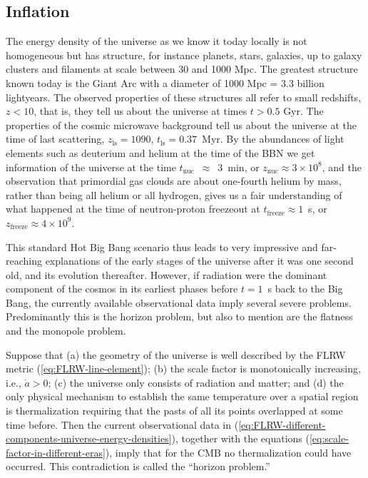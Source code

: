 \subsection{Inflation}
The energy density of the universe as we know it today locally is not homogeneous but has structure, for instance planets, stars, galaxies, up to galaxy clusters and filaments at scale between 30 and 1000 Mpc. The greatest structure known today is the Giant Arc with a diameter of 1000 Mpc = 3.3 billion lightyears. \cite{Lopez-et-al-2022}
The observed properties of these structures all refer to small redshifts, $z < 10$, that is, they tell us about the universe at times $t > 0.5$ Gyr. The properties of the cosmic microwave background tell us about the universe at the time of last scattering, $z_{\mathrm{ls}} = 1090$, $t_{\mathrm{ls}} = 0.37$~Myr. By the abundances of light elements such as deuterium and helium at the time of the BBN we get information of the universe at the time $t_{\mathrm{nuc}}$~$\approx$~3~min, or $z_{\mathrm{nuc}} \approx 3 \times 10^{8}$, and the observation that primordial gas clouds are about one-fourth helium by mass, rather than being all helium or all hydrogen, gives us a fair understanding of what happened at the time of neutron-proton freezeout at $t_{\mathrm{freeze}} \approx 1$~s, or $z_{\mathrm{freeze}} \approx 4 \times 10^{9}$.
\cite[185]{Ryden-2017}

This standard Hot Big Bang scenario thus leads to very impressive and far-reaching explanations of the early stages of the universe after it was one second old, and its evolution thereafter. However, if radiation were the dominant component of the cosmos in its earliest phases before $t = 1$~s back to the Big Bang, the currently available observational data imply several severe problems. Predominantly this is the horizon problem, but also to mention are the flatness and the monopole problem. \cite[186-192]{Ryden-2017}

\begin{satz}
	\label{theo:horizon-problem}
	Suppose that 
	(a) the geometry of the universe is well described by the FLRW metric (\ref{eq:FLRW-line-element});
	(b) the scale factor is monotonically increasing, i.e., $\dot{a} > 0$;
	(c) the universe only consists of radiation and matter;
	and (d) the only physical mechanism to establish the same temperature over a spatial region is thermalization requiring that the pasts of all its points overlapped at some time before.
	Then the current observational data in (\ref{eq:FLRW-different-components-universe-energy-densities}),
	together with the equations (\ref{eq:scale-factor-in-different-eras}), 
	imply that for the CMB no thermalization could have occurred.
	This contradiction is called the “horizon problem.”
\end{satz}

